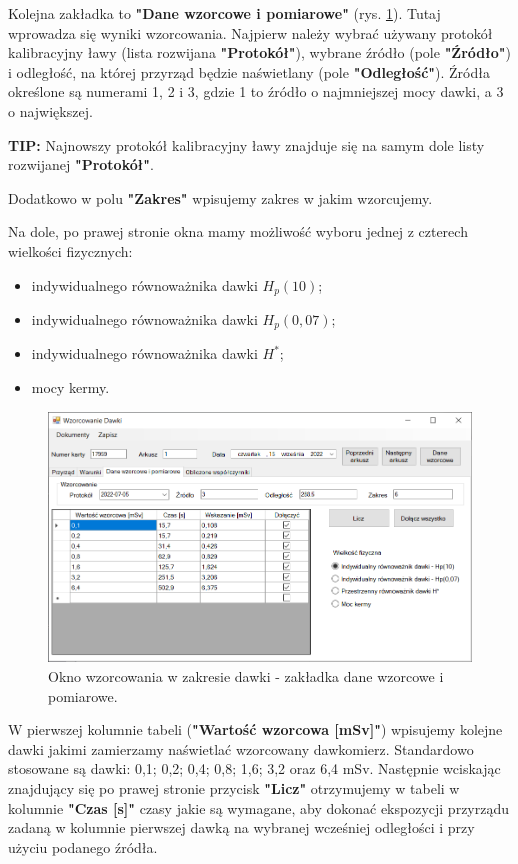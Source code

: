 Kolejna zakładka to \textbf{"Dane wzorcowe i pomiarowe"} (rys. \ref{dawkaDane}). Tutaj wprowadza się wyniki wzorcowania. Najpierw należy wybrać używany protokół kalibracyjny ławy (lista rozwijana \textbf{"Protokół"}), wybrane źródło (pole \textbf{"Źródło"}) i odległość, na której przyrząd będzie naświetlany (pole \textbf{"Odległość"}). Źródła określone są numerami 1, 2 i 3, gdzie 1 to źródło o najmniejszej mocy dawki, a 3 o największej.

\textbf{TIP:} Najnowszy protokół kalibracyjny ławy znajduje się na samym dole listy rozwijanej \textbf{"Protokół"}.

Dodatkowo w polu \textbf{"Zakres"} wpisujemy zakres w jakim wzorcujemy. 

Na dole, po prawej stronie okna mamy możliwość wyboru jednej z czterech wielkości fizycznych:
\begin{itemize}
	\item indywidualnego równoważnika dawki $H_{p}(10)$;
	\item indywidualnego równoważnika dawki $H_{p}(0,07)$;
	\item indywidualnego równoważnika dawki $H^{*}$;
	\item mocy kermy.
\end{itemize}

\begin{figure}[htb]
	\centering
	\includegraphics[width=\columnwidth]{obrazki/Wzorcowanie/dawka/dane.png}
	\caption{Okno wzorcowania w zakresie dawki - zakładka dane wzorcowe i pomiarowe.}
	\label{dawkaDane}
\end{figure}

W pierwszej kolumnie tabeli (\textbf{"Wartość wzorcowa [mSv]"}) wpisujemy kolejne dawki jakimi zamierzamy naświetlać wzorcowany dawkomierz. Standardowo stosowane są dawki: 0,1; 0,2; 0,4; 0,8; 1,6; 3,2 oraz 6,4 mSv. Następnie wciskając znajdujący się po prawej stronie przycisk \textbf{"Licz"} otrzymujemy w tabeli w kolumnie \textbf{"Czas [s]"} czasy jakie są wymagane, aby dokonać ekspozycji przyrządu zadaną w kolumnie pierwszej dawką na wybranej wcześniej odległości i przy użyciu podanego źródła.

